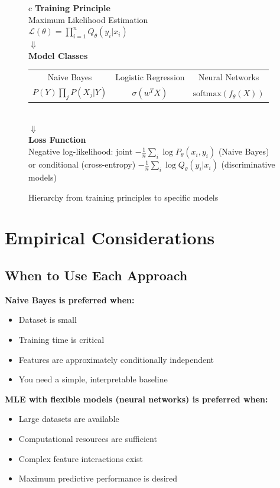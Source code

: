 \begin{notechapter}
\begin{figure}[h]
\centering
\begin{tabular}{c}
\textbf{Training Principle} \\
Maximum Likelihood Estimation \\
$\mathcal{L}(\theta) = \prod_{i=1}^n Q_\theta(y_i|x_i)$ \\
$\Downarrow$ \\
\textbf{Model Classes} \\
\begin{tabular}{ccc}
Naive Bayes & Logistic Regression & Neural Networks \\
$P(Y)\prod_j P(X_j|Y)$ & $\sigma(w^T X)$ & $\text{softmax}(f_\theta(X))$ \\
\end{tabular} \\
$\Downarrow$ \\
\textbf{Loss Function} \\
Negative log-likelihood: joint $-\frac{1}{n}\sum_{i} \log P_\theta(x_i, y_i)$ (Naive Bayes)\\ or conditional (cross-entropy) $-\frac{1}{n}\sum_{i} \log Q_\theta(y_i|x_i)$ (discriminative models)
\end{tabular}
\caption{Hierarchy from training principles to specific models}
\end{figure}

\section{Empirical Considerations}

\subsection{When to Use Each Approach}

\textbf{Naive Bayes is preferred when:}
\begin{itemize}
    \item Dataset is small
    \item Training time is critical
    \item Features are approximately conditionally independent
    \item You need a simple, interpretable baseline
\end{itemize}

\textbf{MLE with flexible models (neural networks) is preferred when:}
\begin{itemize}
    \item Large datasets are available
    \item Computational resources are sufficient
    \item Complex feature interactions exist
    \item Maximum predictive performance is desired
\end{itemize}


\end{notechapter}
